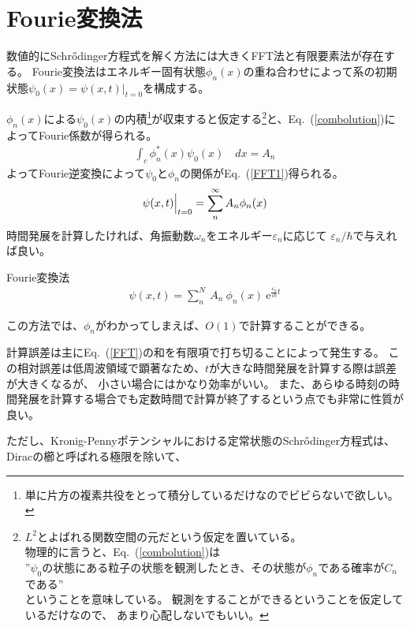 \documentclass[autodetect-engine,dvipdfmx-if-dvi,ja=standard,a4paper,layout=v2]{bxjsreport}
\newcommand{\eref}[1]{Eq.~(\ref{#1})}
\begin{document}
    \section{Fourie変換法}
    数値的にSchrődinger方程式を解く方法には大きくFFT法と有限要素法が存在する。
    Fourie変換法はエネルギー固有状態$\phi_n(x)$の重ね合わせによって系の初期状態$\psi_0(x) = \psi(x, t)|_{t=0}$を構成する。\par
    $\phi_n(x)$による$\psi_0(x)$の内積\footnote{
      単に片方の複素共役をとって積分しているだけなのでビビらないで欲しい。
    }が収束すると仮定する\footnote{
      $L^2$とよばれる関数空間の元だという仮定を置いている。\\
      物理的に言うと、\eref{combolution}は\\
      ”$\psi_0$の状態にある粒子の状態を観測したとき、その状態が$\phi_n$である確率が$C_n$である”\\
      ということを意味している。
      観測をすることができるということを仮定しているだけなので、
      あまり心配しないでもいい。
    }と、\eref{combolution}によってFourie係数が得られる。
    \begin{align}
      \int_{c}\phi^*_n(x)\psi_0(x)\quad dx = A_n\label{combolution}
    \end{align}
    よってFourie逆変換によって$\psi_0$と$\phi_n$の関係が\eref{FFT1}得られる。
    \begin{align}
      \Bigl.\psi(x, t)\Bigr|_{t=0} = \sum_{n}^{\infty} A_{n} \phi_n(x)\label{FFT1}
    \end{align}
    時間発展を計算したければ、角振動数$\omega_n$をエネルギー$\varepsilon_n$に応じて
    $\varepsilon_n / \hbar$で与えれば良い。
    \begin{itembox}[l]{Fourie変換法}
    \begin{align}
      \psi(x,t)=\sum_{n}^{N}\:A_n\ \phi_n(x) \:\mathrm{e}^{\frac{\varepsilon_n}{i\hbar} t}\label{FFT}
    \end{align}
    \end{itembox}
    この方法では、$\phi_n$がわかってしまえば、$O(1)$で計算することができる。\par
    計算誤差は主に\eref{FFT}の和を有限項で打ち切ることによって発生する。
    この相対誤差は低周波領域で顕著なため、$t$が大きな時間発展を計算する際は誤差が大きくなるが、
    小さい場合にはかなり効率がいい。
    また、あらゆる時刻の時間発展を計算する場合でも定数時間で計算が終了するという点でも非常に性質が良い。\par
    ただし、Kronig-Pennyポテンシャルにおける定常状態のSchrődinger方程式は、Diracの櫛と呼ばれる極限を除いて、
\end{document}
